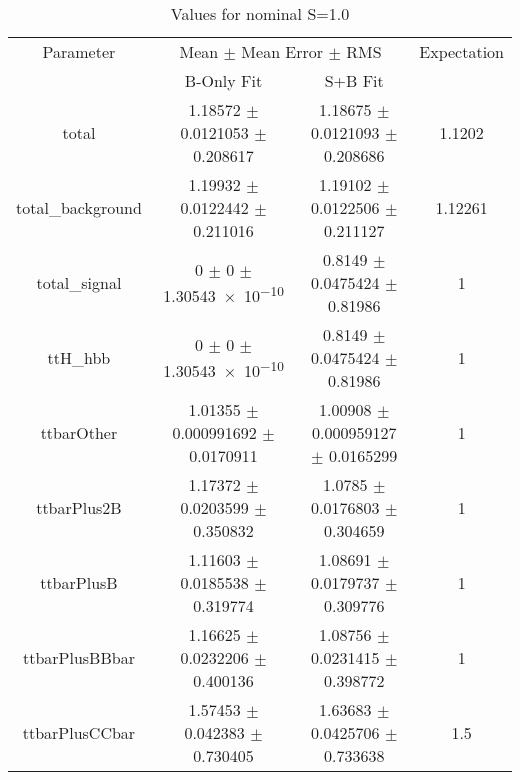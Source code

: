 \begin{table}
\centering
\caption{Values for nominal S=1.0}
\begin{tabular}{cccc}
\toprule
Parameter & \multicolumn{2}{c}{Mean $\pm$ Mean Error $\pm$ RMS} & Expectation\\
 & B-Only Fit & S+B Fit & \\
\midrule
total & \num{1.18572} $\pm$ \num{0.0121053} $\pm$ \num{0.208617} & \num{1.18675} $\pm$ \num{0.0121093} $\pm$ \num{0.208686} & \num{1.1202}\\
total\_background & \num{1.19932} $\pm$ \num{0.0122442} $\pm$ \num{0.211016} & \num{1.19102} $\pm$ \num{0.0122506} $\pm$ \num{0.211127} & \num{1.12261}\\
total\_signal & \num{0} $\pm$ \num{0} $\pm$ \num{1.30543e-10} & \num{0.8149} $\pm$ \num{0.0475424} $\pm$ \num{0.81986} & \num{1}\\
ttH\_hbb & \num{0} $\pm$ \num{0} $\pm$ \num{1.30543e-10} & \num{0.8149} $\pm$ \num{0.0475424} $\pm$ \num{0.81986} & \num{1}\\
ttbarOther & \num{1.01355} $\pm$ \num{0.000991692} $\pm$ \num{0.0170911} & \num{1.00908} $\pm$ \num{0.000959127} $\pm$ \num{0.0165299} & \num{1}\\
ttbarPlus2B & \num{1.17372} $\pm$ \num{0.0203599} $\pm$ \num{0.350832} & \num{1.0785} $\pm$ \num{0.0176803} $\pm$ \num{0.304659} & \num{1}\\
ttbarPlusB & \num{1.11603} $\pm$ \num{0.0185538} $\pm$ \num{0.319774} & \num{1.08691} $\pm$ \num{0.0179737} $\pm$ \num{0.309776} & \num{1}\\
ttbarPlusBBbar & \num{1.16625} $\pm$ \num{0.0232206} $\pm$ \num{0.400136} & \num{1.08756} $\pm$ \num{0.0231415} $\pm$ \num{0.398772} & \num{1}\\
ttbarPlusCCbar & \num{1.57453} $\pm$ \num{0.042383} $\pm$ \num{0.730405} & \num{1.63683} $\pm$ \num{0.0425706} $\pm$ \num{0.733638} & \num{1.5}\\
\bottomrule
\end{tabular}
\end{table}